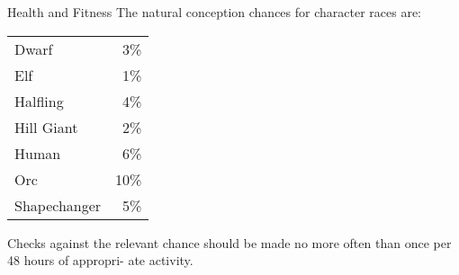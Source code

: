 \begin{Chapter}{Health and Fitness}
The natural conception chances for character races 
are:  

\begin{tabularx}{\columnwidth}{lr}
Dwarf		& 3\% \\
Elf		& 1\% \\
Halfling	& 4\% \\ 
Hill Giant	& 2\% \\
Human		& 6\% \\
Orc		& 10\% \\
Shapechanger	& 5\% \\
\end{tabularx}

Checks against the relevant chance should be made no more often than
once per 48 hours of appropri- ate activity.
\end{Chapter}
